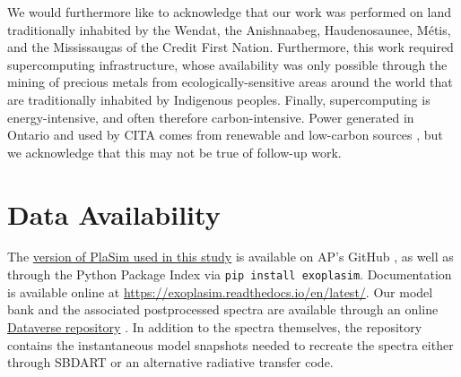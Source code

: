 \documentclass[fleqn,usenatbib]{mnras}
\begin{document}
We would furthermore like to acknowledge that our work was performed on land traditionally inhabited by the Wendat, the Anishnaabeg, Haudenosaunee, M\'{e}tis, and the Mississaugas of the Credit First Nation. Furthermore, this work required supercomputing infrastructure, whose availability was only possible through the mining of precious metals from ecologically-sensitive areas around the world that are traditionally inhabited by Indigenous peoples. Finally, supercomputing is energy-intensive, and often therefore carbon-intensive. Power generated in Ontario and used by CITA comes from renewable and low-carbon sources \citep{CER}, but we acknowledge that this may not be true of follow-up work.

\section*{Data Availability}\label{sec:data}

The \href{https://github.com/alphaparrot/ExoPlaSim/releases/tag/v1.1.0}{version of PlaSim used in this study} is available on AP's GitHub \citep[version 1.1.0,][]{gplasim}, as well as through the Python Package Index via \texttt{pip install exoplasim}. Documentation is available online at \url{https://exoplasim.readthedocs.io/en/latest/}. Our model bank and the associated postprocessed spectra are available through an online \href{https://dataverse.scholarsportal.info/dataverse/kmenou}{Dataverse repository} \citep{Paradise2021b_data}. In addition to the spectra themselves, the repository contains the instantaneous model snapshots needed to recreate the spectra either through SBDART or an alternative radiative transfer code.





\end{document}
